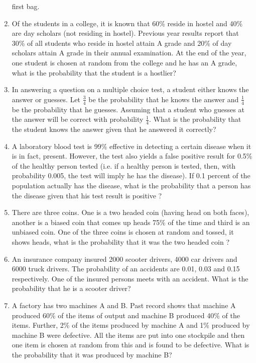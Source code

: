 \begin{enumerate}[label=\thechapter.\arabic*,ref=\thechapter.\theenumi]
first bag.
		\label{ncert/12/13/3/2}
\item Of the students in a college, it is known that 60\% reside in hostel and 40\% are
day scholars (not residing in hostel). Previous year results report that 30\% of all
students who reside in hostel attain A grade and 20\% of day scholars attain A
grade in their annual examination. At the end of the year, one student is chosen
at random from the college and he has an A grade, what is the probability that the
student is a hostlier?     
		\label{ncert/12/13/3/3}
\\
\solution

\item In answering a question on a multiple choice test, a student either knows the
answer or guesses. Let
$\frac{3}{4}$ be the probability that he knows the answer and
$\frac{1}{4}$
be the probability that he guesses. Assuming that a student who guesses at the
answer will be correct with probability
$\frac{1}{4}$. What is the probability that the student knows the answer given that he answered it correctly?
\\
\solution

\item A laboratory blood test is 99\% effective in detecting a certain disease when it is
in fact, present. However, the test also yields a false positive result for 0.5\% of
the healthy person tested (i.e. if a healthy person is tested, then, with probability
0.005, the test will imply he has the disease). If 0.1 percent of the population
actually has the disease, what is the probability that a person has the disease
given that his test result is positive ?
\\
\solution

\item There are three coins. One is a two headed coin (having head on both faces),
another is a biased coin that comes up heads 75\% of the time and third is an
unbiased coin. One of the three coins is chosen at random and tossed, it shows
heads, what is the probability that it was the two headed coin ?
\\
\solution


\item An insurance company insured 2000 scooter drivers, 4000 car drivers and 6000
truck drivers. The probability of an accidents are 0.01, 0.03 and 0.15 respectively.
One of the insured persons meets with an accident. What is the probability that
he is a scooter driver?
\item A factory has two machines A and B. Past record shows that machine A produced
60\% of the items of output and machine B produced 40\% of the items. Further,
2\% of the items produced by machine A and 1\% produced by machine B were
defective. All the items are put into one stockpile and then one item is chosen at
random from this and is found to be defective. What is the probability that it was
produced by machine B?


\end{enumerate}

